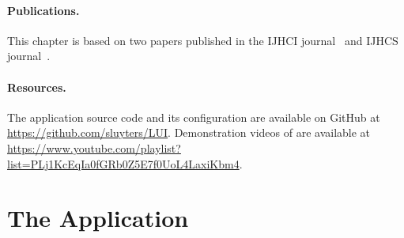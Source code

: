 \paragraph{Publications.} This chapter is based on two papers published in the IJHCI journal~\cite{Sluyters:2022:LUI} and IJHCS journal~\cite{Sellier:2024}.

\paragraph{Resources.} The \lui application source code and its \ql configuration are available on GitHub at \url{https://github.com/sluyters/LUI}. Demonstration videos of \lui are available at \url{https://www.youtube.com/playlist?list=PLj1KcEqIa0fGRb0Z5E7f0UoL4LaxiKbm4}.

\section{The \lui Application} \label{sec:lui:description}

